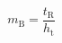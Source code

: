 \begin{equation}
\label{eq24}
m_{\mathrm{B}}\mathrm{=}\frac{t_{\mathrm{R}}}{h_{\mathrm{t}}}
\end{equation}